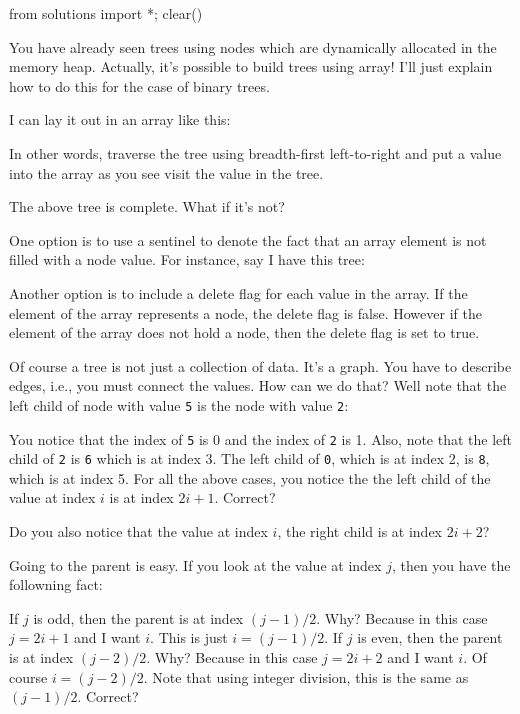 \begin{python0}
from solutions import *; clear()
\end{python0}

You have already seen trees using nodes which are dynamically
allocated in the memory heap.
Actually, it's possible to build trees using array!
I'll just explain how to do this for the case of binary trees.



I can lay it out in an array like this:



In other words, traverse the tree using breadth-first left-to-right
and put a value into the array as you see visit the value in the tree.

The above tree is complete.
What if it's not?

One option is to use a sentinel to denote the
fact that an array element is not filled with a node value.
For instance, say I have this tree:





Another option is to include a delete flag
for each value in the array.
If the element of the array represents a node,
the delete flag is false.
However if the element of the array does not hold a node,
then the delete flag is set to true.



Of course a tree is not just a collection of data.
It's a graph.
You have to describe edges, i.e., you must
connect the values.
How can we do that?
Well note that the left child of node with value \verb!5! is 
the node with value \verb!2!:



You notice that the index of \verb!5! is 0 and the index of 
\verb!2! is 1.
Also, note that the left child of \verb!2! is \verb!6!
which is at index 3.
The left child of \verb!0!, which is at index 2, is \verb!8!,
which is at index 5.
For all the above cases,
you notice the the left child of the value at index $i$
is at index $2i + 1$.
Correct?

Do you also notice that the value at index $i$, the
right child is at index $2i + 2$?

Going to the parent is easy.
If you look at the value at index $j$,
then you have the followning fact:
\begin{tightlist}
\li If $j$ is odd, then the parent is at index $(j - 1) / 2$.
Why? Because in this case $j = 2i + 1$ and I want $i$.
This is just $i = (j - 1) / 2$.
\li If $j$ is even, then the parent is at index $(j - 2)/ 2$.
Why? Because in this case $j = 2i + 2$ and I want $i$.
Of course $i = (j - 2) / 2$.
Note that using integer division, this is the same as
$(j - 1) / 2$.
Correct?
\end{tightlist}

